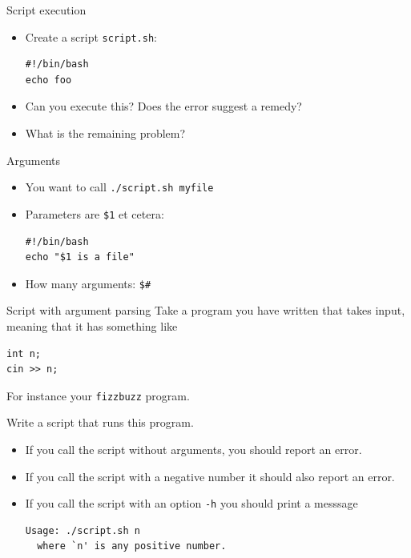\documentclass[11pt,headernav]{beamer}
\begin{document}
\begin{numberedframe}{Script execution}
  \label{sl-lnx:script}
  \begin{itemize}
  \item Create a script \lstinline{script.sh}:
\begin{lstlisting}
#!/bin/bash
echo foo
\end{lstlisting}
\item Can you execute this? Does the error suggest a remedy?
\item What is the remaining problem?
  \end{itemize}
\end{numberedframe}

\begin{numberedframe}{Arguments}

  \begin{itemize}
  \item You want to call \lstinline{./script.sh myfile}
    \item Parameters are \lstinline{$1} et cetera:
\begin{lstlisting}
#!/bin/bash
echo "$1 is a file"
\end{lstlisting}
\item How many arguments: \lstinline{$#}
  \end{itemize}
\end{numberedframe}

\begin{exerciseframe}{Script with argument parsing}
  Take a program you have written that takes input,
  meaning that it has something like 
\begin{lstlisting}
int n;
cin >> n;
\end{lstlisting}
  For instance your \lstinline{fizzbuzz} program.

   Write a script that runs this program.
   \begin{itemize}
   \item
     If you call the script without arguments,
     you should report an error.
   \item If you call the script with a negative number
     it should also report an error.
   \item If you call the script with an option \lstinline{-h}
     you should print a messsage
\begin{lstlisting}
Usage: ./script.sh n
  where `n' is any positive number.
\end{lstlisting}
   \end{itemize}
\end{exerciseframe}
\end{document}
